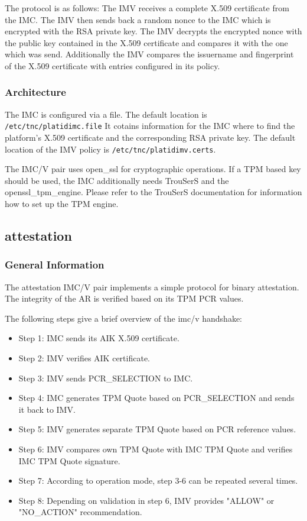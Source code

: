 \documentclass[a4paper,10pt]{scrartcl}
\begin{document}
The protocol is as follows: The IMV receives a complete X.509 certificate
from the IMC. The IMV then sends back a random nonce to the IMC which is encrypted
with the RSA private key. The IMV decrypts the encrypted nonce with the public key
contained in the X.509 certificate and compares it with the one which was
send. Additionally the IMV compares the issuername and fingerprint of the
X.509 certificate with entries configured in its policy.

\subsubsection{Architecture}
The IMC is configured via a file. The default location is \texttt{/etc/tnc/platidimc.file}
It cotains information for the IMC where to find the platform's X.509 certificate
and the corresponding RSA private key. The default location of the IMV policy is
\texttt{/etc/tnc/platidimv.certs}.

The IMC/V pair uses open\_ssl for cryptographic operations. If a TPM based key
should be used, the IMC additionally needs TrouSerS and the openssl\_tpm\_engine.
Please refer to the TrouSerS documentation for information how to set up the TPM engine. 

\subsection{attestation}
\subsubsection{General Information} 
The attestation IMC/V pair implements a simple protocol for binary attestation. The integrity
of the AR is verified based on its TPM PCR values.

The following steps give a brief overview of the imc/v handshake:
\begin{itemize}
	\item{Step 1: IMC sends its AIK X.509 certificate.}
	\item{Step 2: IMV verifies AIK certificate.}
	\item{Step 3: IMV sends PCR\_SELECTION to IMC.}
	\item{Step 4: IMC generates TPM Quote based on PCR\_SELECTION and sends it back to IMV.}
	\item{Step 5: IMV generates separate TPM Quote based on PCR reference values.}
	\item{Step 6: IMV compares own TPM Quote with IMC TPM Quote and verifies IMC TPM Quote signature.}
	\item{Step 7: According to operation mode, step 3-6 can be repeated several times.}
	\item{Step 8: Depending on validation in step 6, IMV provides "ALLOW" or "NO\_ACTION" recommendation.}
\end{itemize}
\end{document}
